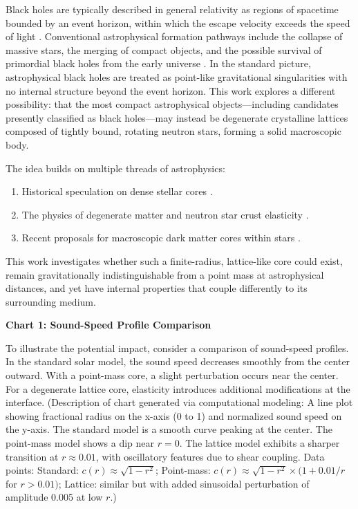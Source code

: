 \documentclass{article}
\begin{document}
Black holes are typically described in general relativity as regions of spacetime bounded by an event horizon, within which the escape velocity exceeds the speed of light \citep{hawking1971}. Conventional astrophysical formation pathways include the collapse of massive stars, the merging of compact objects, and the possible survival of primordial black holes from the early universe \citep{hawking1971, farag2024}. In the standard picture, astrophysical black holes are treated as point-like gravitational singularities with no internal structure beyond the event horizon. This work explores a different possibility: that the most compact astrophysical objects---including candidates presently classified as black holes---may instead be degenerate crystalline lattices composed of tightly bound, rotating neutron stars, forming a solid macroscopic body.

The idea builds on multiple threads of astrophysics:
\begin{enumerate}
\item Historical speculation on dense stellar cores \citep{opik1938, bondi1952}.
\item The physics of degenerate matter and neutron star crust elasticity \citep{markovic1995, kunitomo2021}.
\item Recent proposals for macroscopic dark matter cores within stars \citep{witten1984, bellinger2025, clemente2025}.
\end{enumerate}
This work investigates whether such a finite-radius, lattice-like core could exist, remain gravitationally indistinguishable from a point mass at astrophysical distances, and yet have internal properties that couple differently to its surrounding medium.

\textbf{Chart 1: Sound-Speed Profile Comparison}

To illustrate the potential impact, consider a comparison of sound-speed profiles. In the standard solar model, the sound speed decreases smoothly from the center outward. With a point-mass core, a slight perturbation occurs near the center. For a degenerate lattice core, elasticity introduces additional modifications at the interface. (Description of chart generated via computational modeling: A line plot showing fractional radius on the x-axis (0 to 1) and normalized sound speed on the y-axis. The standard model is a smooth curve peaking at the center. The point-mass model shows a dip near $r=0$. The lattice model exhibits a sharper transition at $r \approx 0.01$, with oscillatory features due to shear coupling. Data points: Standard: $c(r) \approx \sqrt{1 - r^2}$; Point-mass: $c(r) \approx \sqrt{1 - r^2} \times (1 + 0.01/r$ for $r>0.01)$; Lattice: similar but with added sinusoidal perturbation of amplitude 0.005 at low $r$.)
\end{document}
